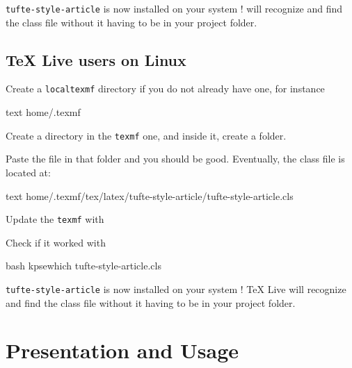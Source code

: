 \documentclass[raggedright, twoside, 11pt]{tufte-style-article}
\begin{document}
\texttt{tufte-style-article} is now installed on your system !  will recognize and find the class file without it having to be in your project folder.


\subsection{\TeX{} Live users on Linux}

\begin{ol}
	
\item Create a \texttt{localtexmf} directory if you do not already have one, for instance
\begin{codebox}{text}
home/.texmf
\end{codebox}
	
\item Create a  directory in the \texttt{texmf} one, and inside it, create a  folder.
		
\item Paste the  file in that  folder and you should be good. Eventually, the class file is located at:
\begin{codebox}{text}
home/.texmf/tex/latex/tufte-style-article/tufte-style-article.cls
\end{codebox}
		
\item Update the \texttt{texmf} with

\item Check if it worked with
\begin{codebox}{bash}
kpsewhich tufte-style-article.cls
\end{codebox}
		
\end{ol}	
	
\texttt{tufte-style-article} is now installed on your system ! \TeX{} Live will recognize and find the class file without it having to be in your project folder.


\section{Presentation and Usage}
\end{document}
